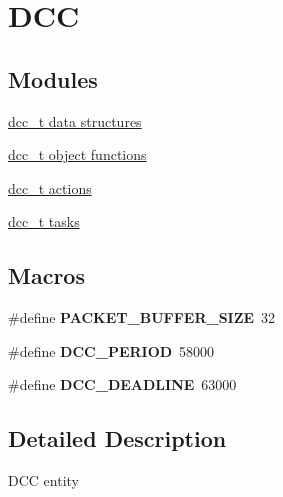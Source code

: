 \hypertarget{group__DCC}{\section{D\-C\-C}
\label{group__DCC}
}
\subsection*{Modules}
\begin{DoxyCompactItemize}
\item 
\hyperlink{group__dcc__t__structs}{dcc\-\_\-t data structures}
\item 
\hyperlink{group__dcc__t__object}{dcc\-\_\-t object functions}
\item 
\hyperlink{group__dcc__t__actions}{dcc\-\_\-t actions}
\item 
\hyperlink{group__dcc__t__tasks}{dcc\-\_\-t tasks}
\end{DoxyCompactItemize}
\subsection*{Macros}
\begin{DoxyCompactItemize}
\item 
\hypertarget{group__DCC_gab30af815d6e9494361629440f14e3716}{\#define {\bfseries P\-A\-C\-K\-E\-T\-\_\-\-B\-U\-F\-F\-E\-R\-\_\-\-S\-I\-Z\-E}~32}\label{group__DCC_gab30af815d6e9494361629440f14e3716}

\item 
\hypertarget{group__DCC_ga9c864f3eb4dde448f5d31dda47c8a602}{\#define {\bfseries D\-C\-C\-\_\-\-P\-E\-R\-I\-O\-D}~58000}\label{group__DCC_ga9c864f3eb4dde448f5d31dda47c8a602}

\item 
\hypertarget{group__DCC_ga4ae7dfe73b5ebd50713d44bf89a6e9d6}{\#define {\bfseries D\-C\-C\-\_\-\-D\-E\-A\-D\-L\-I\-N\-E}~63000}\label{group__DCC_ga4ae7dfe73b5ebd50713d44bf89a6e9d6}

\end{DoxyCompactItemize}


\subsection{Detailed Description}
D\-C\-C entity 